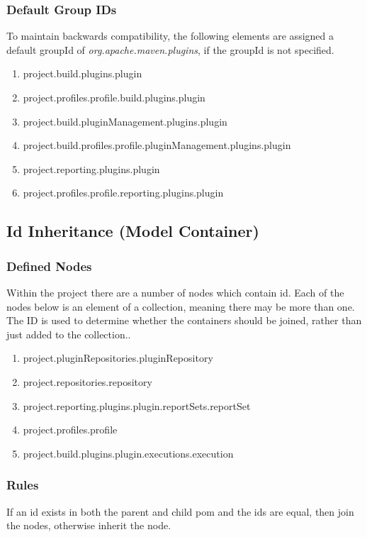 \documentclass[12pt]{amsart}
\begin{document}
\subsubsection{Default Group IDs}
To maintain backwards compatibility, the following elements are assigned a default groupId of \emph{org.apache.maven.plugins}, if the groupId is not specified. 
\begin{enumerate}
\item project.build.plugins.plugin
\item project.profiles.profile.build.plugins.plugin
\item project.build.pluginManagement.plugins.plugin
\item project.build.profiles.profile.pluginManagement.plugins.plugin
\item project.reporting.plugins.plugin
\item project.profiles.profile.reporting.plugins.plugin
\end{enumerate}

\subsection{Id Inheritance (Model Container)}

\subsubsection{Defined Nodes}
Within the project there are a number of nodes which contain id. Each of the nodes below is an element of a collection, meaning there may be more than one. The ID is used to determine whether the containers should be joined, rather than just added to the collection..
\begin{enumerate}
\item project.pluginRepositories.pluginRepository
\item project.repositories.repository
\item project.reporting.plugins.plugin.reportSets.reportSet
\item project.profiles.profile
\item project.build.plugins.plugin.executions.execution
\end{enumerate}

\subsubsection{Rules}
If an id exists in both the parent and child pom and the ids are equal, then join the nodes, otherwise inherit the node. 
\end{document}
